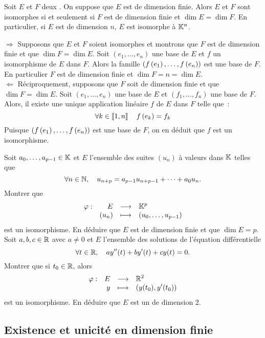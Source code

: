 \documentclass{magnolia}
\begin{document}
\begin{proposition}[utile=2]
Soit $E$ et $F$ deux \Kevs. On suppose que $E$ est de dimension finie. Alors
$E$ et $F$ sont isomorphes si et seulement si $F$ est de dimension finie et
$\dim E=\dim F$.
En particulier, si $E$ est de dimension $n$, $E$ est isomorphe à $\mathbb{K}^n$.
\end{proposition}
\begin{preuve}
$\Longrightarrow$
Supposons que $E$ et $F$ soient isomorphes et montrons que $F$ est de dimension
finie et que $\dim F=\dim E$. Soit $(e_1,\ldots,e_n)$ une base de $E$ et $f$
un isomorphisme de $E$ dans $F$. Alors la famille $(f\left(e_1\right),\ldots,f\left(e_n\right))$
est une base de $F$. En particulier $F$ est de dimension finie et
$\dim F=n=\dim E$.\\
$\Longleftarrow$
Réciproquement, supposons que $F$ soit de dimension finie et que
$\dim F=\dim E$. Soit $(e_1,\ldots,e_n)$ une base de $E$ et $(f_1,\ldots,f_n)$ une
base de $F$. Alors, il existe une unique application linéaire $f$ de $E$ dans
$F$ telle que~:
\[\forall k\in\left\llbracket 1,n\right\rrbracket \quad f\left(e_k\right)=f_k\]
Puisque $(f\left(e_1\right),\ldots,f\left(e_n\right))$ est une base de $F$, on en déduit que $f$
est un isomorphisme.
\end{preuve}

\begin{exos}
\exo Soit $a_0,\ldots,a_{p-1}\in\mathbb{K}$ et $E$ l'ensemble des suites $(u_n)$ à valeurs dans
$\mathbb{K}$ telles que
\[\forall n\in\mathbb{N},\quad u_{n+p}=a_{p-1}u_{n+p-1}+\cdots+a_0 u_n.\]
Montrer que
\[\begin{array}[t]{lrcl} \displaystyle{\varphi} : & \displaystyle{E} & \longrightarrow & \displaystyle{\ensuremath{\mathbb{K}}^p} \\ & \displaystyle{(u_n)} & \longmapsto & \displaystyle{(u_0,\ldots,u_{p-1})} \end{array}\]
est un isomorphisme. En déduire que $E$ est de dimension finie et que
$\dim E=p$.
\exo Soit $a,b,c\in\mathbb{R}$ avec $a\neq 0$ et $E$ l'ensemble des solutions de l'équation
  différentielle
  \[\forall t\in\mathbb{R},\quad ay''(t)+by'(t)+cy(t)=0.\]
  Montrer que si $t_0\in\mathbb{R}$, alors
  \[\begin{array}[t]{lrcl} \displaystyle{\varphi} : & \displaystyle{E} & \longrightarrow & \displaystyle{\mathbb{R}^2} \\ & \displaystyle{y} & \longmapsto & \displaystyle{(y(t_0),y'(t_0))} \end{array}\]
  est un isomorphisme. En déduire que $E$ est un \Rev de dimension 2.
\end{exos}

\subsection{Existence et unicité en dimension finie}
\end{document}
